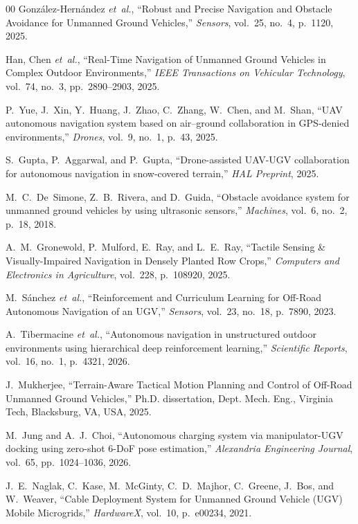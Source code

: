 \documentclass[conference]{IEEEtran}
\begin{document}
\begin{thebibliography}{00}
González-Hernández \textit{et~al.}, ``Robust and Precise Navigation and Obstacle Avoidance for Unmanned Ground Vehicles,'' \textit{Sensors}, vol.~25, no.~4, p.~1120, 2025.

Han, Chen \textit{et~al.}, ``Real-Time Navigation of Unmanned Ground Vehicles in Complex Outdoor Environments,'' \textit{IEEE Transactions on Vehicular Technology}, vol.~74, no.~3, pp.~2890--2903, 2025.

P.~Yue, J.~Xin, Y.~Huang, J.~Zhao, C.~Zhang, W.~Chen, and M.~Shan, ``UAV autonomous navigation system based on air--ground collaboration in GPS-denied environments,'' \textit{Drones}, vol.~9, no.~1, p.~43, 2025.

S.~Gupta, P.~Aggarwal, and P.~Gupta, ``Drone-assisted UAV-UGV collaboration for autonomous navigation in snow-covered terrain,'' \textit{HAL Preprint}, 2025.

M.~C.~De~Simone, Z.~B.~Rivera, and D.~Guida, ``Obstacle avoidance system for unmanned ground vehicles by using ultrasonic sensors,'' \textit{Machines}, vol.~6, no.~2, p.~18, 2018.

A.~M.~Gronewold, P.~Mulford, E.~Ray, and L.~E.~Ray, ``Tactile Sensing \& Visually-Impaired Navigation in Densely Planted Row Crops,'' \textit{Computers and Electronics in Agriculture}, vol.~228, p.~108920, 2025.

M.~Sánchez \textit{et~al.}, ``Reinforcement and Curriculum Learning for Off-Road Autonomous Navigation of an UGV,'' \textit{Sensors}, vol.~23, no.~18, p.~7890, 2023.

A.~Tibermacine \textit{et~al.}, ``Autonomous navigation in unstructured outdoor environments using hierarchical deep reinforcement learning,'' \textit{Scientific Reports}, vol.~16, no.~1, p.~4321, 2026.

J.~Mukherjee, ``Terrain-Aware Tactical Motion Planning and Control of Off-Road Unmanned Ground Vehicles,'' Ph.D. dissertation, Dept. Mech. Eng., Virginia Tech, Blacksburg, VA, USA, 2025.

M.~Jung and A.~J.~Choi, ``Autonomous charging system via manipulator-UGV docking using zero-shot 6-DoF pose estimation,'' \textit{Alexandria Engineering Journal}, vol.~65, pp.~1024--1036, 2026.

J.~E.~Naglak, C.~Kase, M.~McGinty, C.~D.~Majhor, C.~Greene, J.~Bos, and W.~Weaver, ``Cable Deployment System for Unmanned Ground Vehicle (UGV) Mobile Microgrids,'' \textit{HardwareX}, vol.~10, p.~e00234, 2021.


\end{thebibliography}
\end{document}
